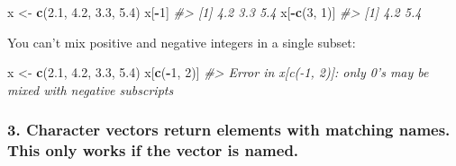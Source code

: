 \documentclass[]{book}
\newenvironment{Shaded}{\begin{snugshade}}{\end{snugshade}}
\newcommand{\CommentTok}[1]{\textcolor[rgb]{0.56,0.35,0.01}{\textit{#1}}}
\newcommand{\DecValTok}[1]{\textcolor[rgb]{0.00,0.00,0.81}{#1}}
\newcommand{\FloatTok}[1]{\textcolor[rgb]{0.00,0.00,0.81}{#1}}
\newcommand{\KeywordTok}[1]{\textcolor[rgb]{0.13,0.29,0.53}{\textbf{#1}}}
\newcommand{\NormalTok}[1]{#1}
\newcommand{\OperatorTok}[1]{\textcolor[rgb]{0.81,0.36,0.00}{\textbf{#1}}}
\newcommand{\StringTok}[1]{\textcolor[rgb]{0.31,0.60,0.02}{#1}}
\begin{document}
\begin{Shaded}
\begin{Highlighting}[]
\NormalTok{x <-}\StringTok{ }\KeywordTok{c}\NormalTok{(}\FloatTok{2.1}\NormalTok{, }\FloatTok{4.2}\NormalTok{, }\FloatTok{3.3}\NormalTok{, }\FloatTok{5.4}\NormalTok{)}
\NormalTok{x[}\OperatorTok{-}\DecValTok{1}\NormalTok{]}
\CommentTok{#> [1] 4.2 3.3 5.4}
\NormalTok{x[}\OperatorTok{-}\KeywordTok{c}\NormalTok{(}\DecValTok{3}\NormalTok{, }\DecValTok{1}\NormalTok{)]}
\CommentTok{#> [1] 4.2 5.4}
\end{Highlighting}
\end{Shaded}

You can't mix positive and negative integers in a single subset:

\begin{Shaded}
\begin{Highlighting}[]
\NormalTok{x <-}\StringTok{ }\KeywordTok{c}\NormalTok{(}\FloatTok{2.1}\NormalTok{, }\FloatTok{4.2}\NormalTok{, }\FloatTok{3.3}\NormalTok{, }\FloatTok{5.4}\NormalTok{)}
\NormalTok{x[}\KeywordTok{c}\NormalTok{(}\OperatorTok{-}\DecValTok{1}\NormalTok{, }\DecValTok{2}\NormalTok{)]}
\CommentTok{#> Error in x[c(-1, 2)]: only 0's may be mixed with negative subscripts}
\end{Highlighting}
\end{Shaded}

\hypertarget{character-vectors-return-elements-with-matching-names.-this-only-works-if-the-vector-is-named.}{%
\subsubsection*{\texorpdfstring{3. \textbf{Character vectors} return elements with matching names. This only works if the vector is named.}{3. Character vectors return elements with matching names. This only works if the vector is named.}}\label{character-vectors-return-elements-with-matching-names.-this-only-works-if-the-vector-is-named.}}
\end{document}
